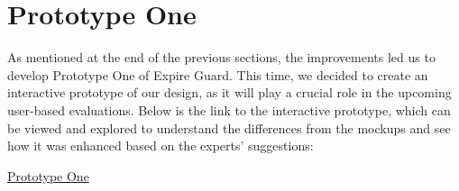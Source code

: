 \section{Prototype One}
As mentioned at the end of the previous sections, the improvements led us to develop Prototype One of Expire Guard. This time, we decided to create an interactive prototype of our design, as it will play a crucial role in the upcoming user-based evaluations. Below is the link to the interactive prototype, which can be viewed and explored to understand the differences from the mockups and see how it was enhanced based on the experts' suggestions:\\

\begin{center}
	\href{https://cloud.justinmind.com/usernote/prototype/4372c6310ba46d2454d45019201840861a78f809548300c60111c9cc07509bd2}{Prototype One}
\end{center}

